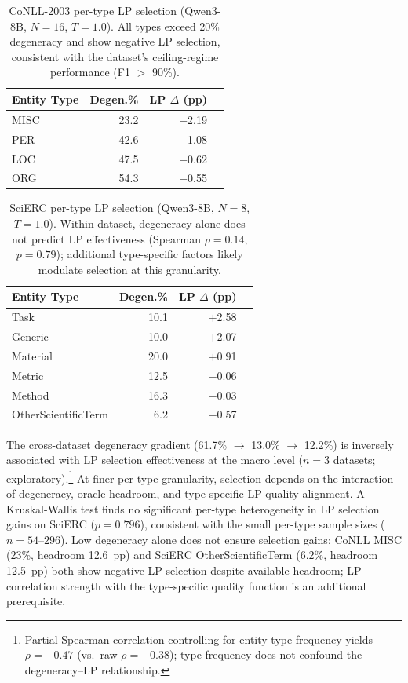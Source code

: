\begin{table}[h]
\centering
\small
\caption{CoNLL-2003 per-type LP selection (Qwen3-8B, $N{=}16$, $T{=}1.0$). All types exceed 20\% degeneracy and show negative LP selection, consistent with the dataset's ceiling-regime performance (F1 $>$ 90\%).}
\label{tab:per_type_lp_conll}
\begin{tabular}{lrrr}
\toprule
Entity Type & Degen.\% & LP $\Delta$ (pp) \\
\midrule
MISC & 23.2 & $-$2.19 \\
PER & 42.6 & $-$1.08 \\
LOC & 47.5 & $-$0.62 \\
ORG & 54.3 & $-$0.55 \\
\bottomrule
\end{tabular}
\end{table}

\begin{table}[h]
\centering
\small
\caption{SciERC per-type LP selection (Qwen3-8B, $N{=}8$, $T{=}1.0$). Within-dataset, degeneracy alone does not predict LP effectiveness (Spearman $\rho{=}0.14$, $p{=}0.79$); additional type-specific factors likely modulate selection at this granularity.}
\label{tab:per_type_lp_scierc}
\begin{tabular}{lrrr}
\toprule
Entity Type & Degen.\% & LP $\Delta$ (pp) \\
\midrule
Task & 10.1 & $+$2.58 \\
Generic & 10.0 & $+$2.07 \\
Material & 20.0 & $+$0.91 \\
Metric & 12.5 & $-$0.06 \\
Method & 16.3 & $-$0.03 \\
OtherScientificTerm & 6.2 & $-$0.57 \\
\bottomrule
\end{tabular}
\end{table}

The cross-dataset degeneracy gradient (61.7\% $\to$ 13.0\% $\to$ 12.2\%) is inversely associated with LP selection effectiveness at the macro level ($n{=}3$ datasets; exploratory).\footnote{Partial Spearman correlation controlling for entity-type frequency yields $\rho{=}{-}0.47$ (vs.\ raw $\rho{=}{-}0.38$); type frequency does not confound the degeneracy--LP relationship.}
At finer per-type granularity, selection depends on the interaction of degeneracy, oracle headroom, and type-specific LP-quality alignment.
A Kruskal-Wallis test finds no significant per-type heterogeneity in LP selection gains on SciERC ($p{=}0.796$), consistent with the small per-type sample sizes ($n{=}54$--$296$).
Low degeneracy alone does not ensure selection gains: CoNLL MISC (23\%, headroom 12.6~pp) and SciERC OtherScientificTerm (6.2\%, headroom 12.5~pp) both show negative LP selection despite available headroom; LP correlation strength with the type-specific quality function is an additional prerequisite.

